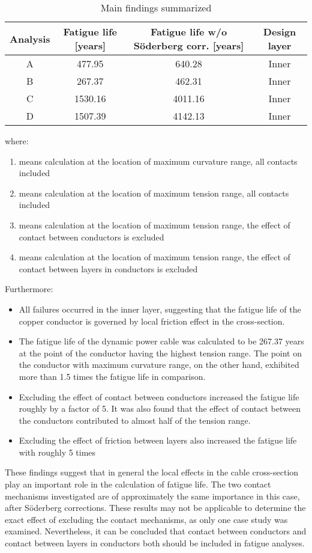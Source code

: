 \begin{table} [H]
\centering
\begin{tabular}{ |c|c|c|c|}
\hline
Analysis & Fatigue life [years] & Fatigue life w/o Söderberg corr. [years] & Design layer \\
 \hline
 \hline
 A & 477.95 & 640.28 & Inner\\
 B & 267.37 &462.31 & Inner\\
 C & 1530.16 & 4011.16 &Inner\\
 D &1507.39  &4142.13 &Inner\\
 \hline
\end{tabular}
\caption{Main findings summarized}
\label{table:mainfind}
\end{table} 
where:
\begin{enumerate}[label=\Alph*]
\item means calculation at the location of maximum curvature range, all contacts included
\item means calculation at the location of maximum tension range, all contacts included
\item means calculation at the location of maximum tension range, the effect of contact between conductors is excluded
\item means calculation at the location of maximum tension range, the effect of contact between layers in conductors is excluded
\end{enumerate}
Furthermore:
\begin{itemize}
\item All failures occurred in the inner layer, suggesting that the fatigue life of the copper conductor is governed by local friction effect in the cross-section.
    \item The fatigue life of the dynamic power cable was calculated to be 267.37 years at the point of the conductor having the highest tension range. The point on the conductor with maximum curvature range, on the other hand, exhibited more than 1.5 times the fatigue life in comparison.
    \item Excluding the effect of contact between conductors increased the fatigue life roughly by a factor of 5. It was also found that the effect of contact between the conductors contributed to almost half of the tension range. 
    \item Excluding the effect of friction between layers also increased the fatigue life with roughly 5 times
\end{itemize}
These findings suggest that in general the local effects in the cable cross-section play an important role in the calculation of fatigue life. The two contact mechanisms investigated are of approximately the same importance in this case, after Söderberg corrections. These results may not be applicable to determine the exact effect of excluding the contact mechanisms,  as only one case study was examined. Nevertheless, it can be concluded that contact between conductors and contact between layers in conductors both should be included in fatigue analyses.

